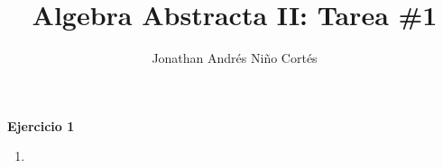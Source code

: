 \documentclass[letter,twoside,12pt]{article}
\title{Algebra Abstracta II: Tarea \#1}
\author{Jonathan Andr\'es Ni\~no Cort\'es}
\begin{document}
\textbf{Ejercicio 1}
\begin{enumerate}
\item 
\end{enumerate}
\end{document}

